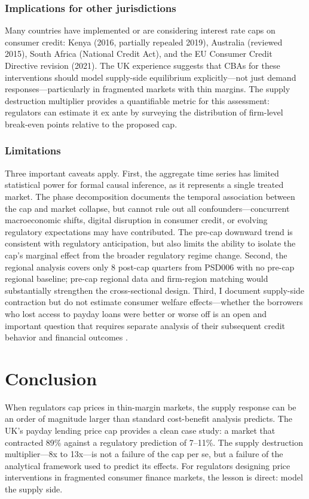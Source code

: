 \documentclass[12pt]{article}
\begin{document}
\subsubsection*{Implications for other jurisdictions} Many countries have implemented or are considering interest rate caps on consumer credit: Kenya (2016, partially repealed 2019), Australia (reviewed 2015), South Africa (National Credit Act), and the EU Consumer Credit Directive revision (2021). The UK experience suggests that CBAs for these interventions should model supply-side equilibrium explicitly---not just demand responses---particularly in fragmented markets with thin margins. The supply destruction multiplier provides a quantifiable metric for this assessment: regulators can estimate it ex ante by surveying the distribution of firm-level break-even points relative to the proposed cap.

\subsubsection*{Limitations} Three important caveats apply. First, the aggregate time series has limited statistical power for formal causal inference, as it represents a single treated market. The phase decomposition documents the temporal association between the cap and market collapse, but cannot rule out all confounders---concurrent macroeconomic shifts, digital disruption in consumer credit, or evolving regulatory expectations may have contributed. The pre-cap downward trend is consistent with regulatory anticipation, but also limits the ability to isolate the cap's marginal effect from the broader regulatory regime change. Second, the regional analysis covers only 8 post-cap quarters from PSD006 with no pre-cap regional baseline; pre-cap regional data and firm-region matching would substantially strengthen the cross-sectional design. Third, I document supply-side contraction but do not estimate consumer welfare effects---whether the borrowers who lost access to payday loans were better or worse off is an open and important question that requires separate analysis of their subsequent credit behavior and financial outcomes \citep{gathergood2019borrower}.

\section{Conclusion}

When regulators cap prices in thin-margin markets, the supply response can be an order of magnitude larger than standard cost-benefit analysis predicts. The UK's payday lending price cap provides a clean case study: a market that contracted 89\% against a regulatory prediction of 7--11\%. The supply destruction multiplier---8x to 13x---is not a failure of the cap per se, but a failure of the analytical framework used to predict its effects. For regulators designing price interventions in fragmented consumer finance markets, the lesson is direct: model the supply side.
\end{document}
